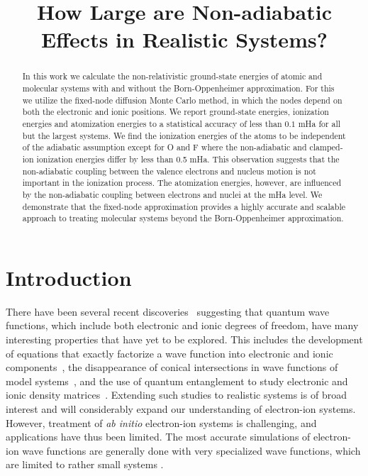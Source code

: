 \documentclass[pra,superscriptaddress,groupedaddress,twocolumn]{revtex4}
\begin{document}
\title{How Large are Non-adiabatic Effects in Realistic Systems?}

\begin{abstract}
In this work we calculate the non-relativistic ground-state energies of atomic and molecular systems with and without the Born-Oppenheimer approximation. For this we utilize the fixed-node diffusion Monte Carlo method, in which the nodes depend on both the electronic and ionic positions. We report ground-state energies, ionization energies and atomization energies to a statistical accuracy of less than $0.1$ mHa for all but the largest systems. We find the ionization energies of the atoms to be independent of the adiabatic assumption except for O and F where the non-adiabatic and clamped-ion ionization energies differ by less than 0.5 mHa. This observation suggests that the non-adiabatic coupling between the valence electrons and nucleus motion is not important in the ionization process. The atomization energies, however, are influenced by the non-adiabatic coupling between electrons and nuclei at the mHa level. We demonstrate that the fixed-node approximation provides a highly accurate and scalable approach to treating molecular systems beyond the Born-Oppenheimer approximation.
\end{abstract}
\maketitle

\section{Introduction}
There have been several recent discoveries~\cite{cederbaum1,gross2014,boent} suggesting that quantum wave functions, which include both electronic and ionic degrees of freedom, have many interesting properties that have yet to be explored.  This includes the development of equations that exactly factorize a wave function into electronic and ionic components~\cite{cederbaum1}, the disappearance of conical intersections in wave functions of model systems~\cite{gross2014}, and the use of quantum entanglement to study electronic and ionic density matrices~\cite{boent}.  Extending such studies to realistic systems is of broad interest and will considerably expand our understanding of electron-ion systems. However, treatment of \textit{ab initio} electron-ion systems is challenging, and applications have thus been limited. The most accurate simulations of electron-ion wave functions are generally done with very specialized wave functions, which are limited to rather small systems \cite{mitroy2013}.  
\end{document}
